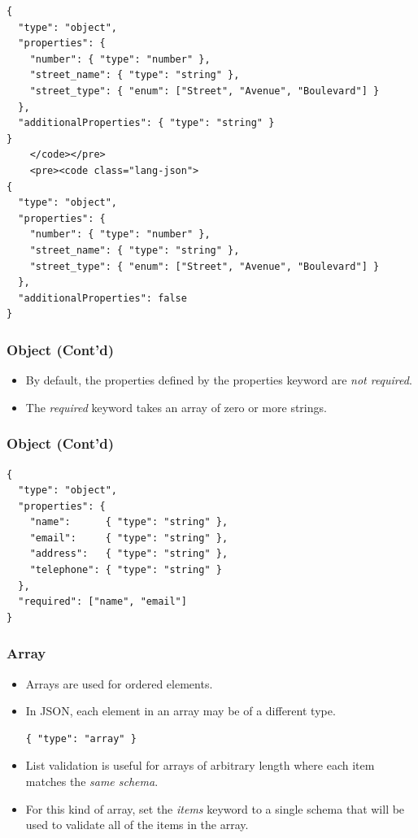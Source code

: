\documentclass{efd-lecture}
\begin{document}
\begin{frame}[fragile]
  \scriptsize
  \begin{verbatim}
{
  "type": "object",
  "properties": {
    "number": { "type": "number" },
    "street_name": { "type": "string" },
    "street_type": { "enum": ["Street", "Avenue", "Boulevard"] }
  },
  "additionalProperties": { "type": "string" }
}
    </code></pre>
    <pre><code class="lang-json">
{
  "type": "object",
  "properties": {
    "number": { "type": "number" },
    "street_name": { "type": "string" },
    "street_type": { "enum": ["Street", "Avenue", "Boulevard"] }
  },
  "additionalProperties": false
}
  \end{verbatim}
\end{frame}

\begin{frame}
  \frametitle{Object (Cont'd)}
  \begin{itemize}
    \item
      By default, the properties defined by the properties keyword are
      \textit{\color{RubineRed}not required}.
    \item
      The \textit{\color{YellowOrange}required} keyword takes an array of
      zero or more strings.
  \end{itemize}
\end{frame}

\begin{frame}[fragile]
  \frametitle{Object (Cont'd)}
  \begin{verbatim}
{
  "type": "object",
  "properties": {
    "name":      { "type": "string" },
    "email":     { "type": "string" },
    "address":   { "type": "string" },
    "telephone": { "type": "string" }
  },
  "required": ["name", "email"]
}
  \end{verbatim}
\end{frame}

\begin{frame}[fragile]
  \frametitle{Array}
  \begin{itemize}
    \item Arrays are used for ordered elements.
    \item In JSON, each element in an array may be of a different type.
    \begin{verbatim}
{ "type": "array" }
    \end{verbatim}
    \item
      List validation is useful for arrays of arbitrary length where each item
      matches the \textit{\color{Yellow} same schema}.
    \item
      For this kind of array, set the
      \textit{\color{YellowOrange} items} keyword to a single schema that
      will be used to validate all of the items in the array.
  \end{itemize}
\end{frame}
\end{document}
